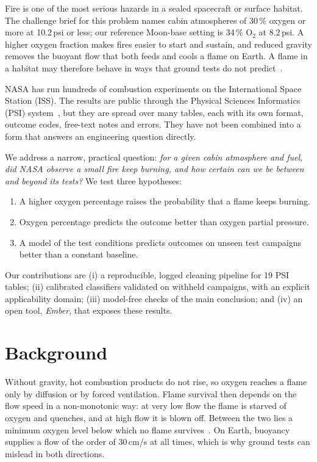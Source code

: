 \documentclass[11pt,twocolumn]{article}
\newcommand{\Otwo}{\ensuremath{\mathrm{O_2}}}
\newcommand{\pct}{\,\%}
\begin{document}
Fire is one of the most serious hazards in a sealed spacecraft or surface habitat. The challenge brief for
this problem names cabin atmospheres of 30\pct{} oxygen or more at 10.2\,psi or less; our reference
Moon-base setting is 34\pct{} \Otwo{} at 8.2\,psi. A higher oxygen fraction makes fires easier to start and
sustain, and reduced gravity removes the buoyant flow that both feeds and cools a flame on Earth. A flame
in a habitat may therefore behave in ways that ground tests do not predict~\cite{nasa2015guide}.

NASA has run hundreds of combustion experiments on the International Space Station (ISS). The results are
public through the Physical Sciences Informatics (PSI) system~\cite{psi}, but they are spread over many
tables, each with its own format, outcome codes, free-text notes and errors. They have not been combined
into a form that answers an engineering question directly.

We address a narrow, practical question: \emph{for a given cabin atmosphere and fuel, did NASA observe a small
fire keep burning, and how certain can we be between and beyond its tests?} We test three hypotheses:
\begin{enumerate}[label=\textbf{H\arabic*.}]
  \item A higher oxygen percentage raises the probability that a flame keeps burning.
  \item Oxygen percentage predicts the outcome better than oxygen partial pressure.
  \item A model of the test conditions predicts outcomes on unseen test campaigns better than a constant
        baseline.
\end{enumerate}
Our contributions are (i) a reproducible, logged cleaning pipeline for 19 PSI tables; (ii) calibrated
classifiers validated on withheld campaigns, with an explicit applicability domain; (iii) model-free checks
of the main conclusion; and (iv) an open tool, \emph{Ember}, that exposes these results.

\section{Background}

Without gravity, hot combustion products do not rise, so oxygen reaches a flame only by diffusion or by
forced ventilation. Flame survival then depends on the flow speed in a non-monotonic way: at very low flow
the flame is starved of oxygen and quenches, and at high flow it is blown off. Between the two lies a
minimum oxygen level below which no flame survives~\cite{olson1991}. On Earth, buoyancy supplies a flow
of the order of 30\,cm/s at all times, which is why ground tests can mislead in both directions.
\end{document}
